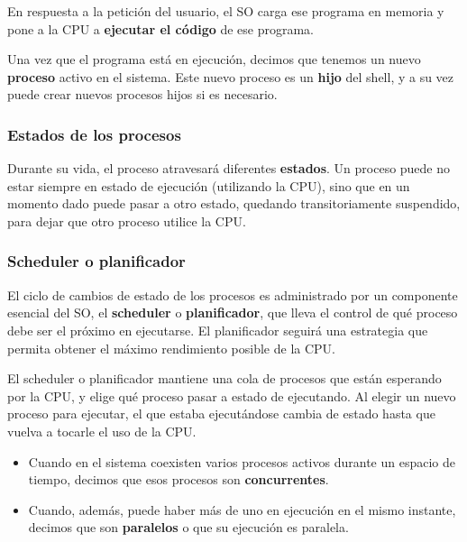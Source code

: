 \documentclass[spanish,a4paper,]{article}
\providecommand{\tightlist}{%
  \setlength{\itemsep}{0pt}\setlength{\parskip}{0pt}}
\begin{document}
En respuesta a la petición del usuario, el SO carga ese programa en
memoria y pone a la CPU a \textbf{ejecutar el código} de ese programa.

Una vez que el programa está en ejecución, decimos que tenemos un nuevo
\textbf{proceso} activo en el sistema. Este nuevo proceso es un
\textbf{hijo} del shell, y a su vez puede crear nuevos procesos hijos si
es necesario.

\hypertarget{estados-de-los-procesos}{%
\subsubsection{Estados de los procesos}\label{estados-de-los-procesos}}

Durante su vida, el proceso atravesará diferentes \textbf{estados}. Un
proceso puede no estar siempre en estado de ejecución (utilizando la
CPU), sino que en un momento dado puede pasar a otro estado, quedando
transitoriamente suspendido, para dejar que otro proceso utilice la CPU.

\hypertarget{scheduler-o-planificador}{%
\subsubsection{Scheduler o
planificador}\label{scheduler-o-planificador}}

El ciclo de cambios de estado de los procesos es administrado por un
componente esencial del SO, el \textbf{scheduler} o
\textbf{planificador}, que lleva el control de qué proceso debe ser el
próximo en ejecutarse. El planificador seguirá una estrategia que
permita obtener el máximo rendimiento posible de la CPU.

El scheduler o planificador mantiene una cola de procesos que están
esperando por la CPU, y elige qué proceso pasar a estado de ejecutando.
Al elegir un nuevo proceso para ejecutar, el que estaba ejecutándose
cambia de estado hasta que vuelva a tocarle el uso de la CPU.

\begin{itemize}
\tightlist
\item
  Cuando en el sistema coexisten varios procesos activos durante un
  espacio de tiempo, decimos que esos procesos son
  \textbf{concurrentes}.
\item
  Cuando, además, puede haber más de uno en ejecución en el mismo
  instante, decimos que son \textbf{paralelos} o que su ejecución es
  paralela.
\end{itemize}
\end{document}
